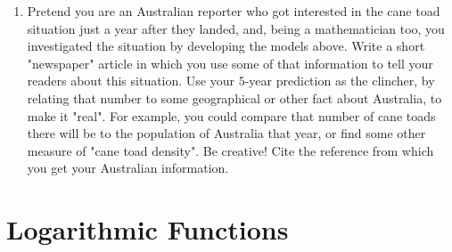 \documentclass[10pt,]{book}
\theoremstyle{plain}
\theoremstyle{definition}
\theoremstyle{definition}
\theoremstyle{definition}
\numberwithin{equation}{section}
\begin{document}
\begin{exerciselist}
\begin{enumerate}[label=(\alph*)]
\item\hypertarget{li-171}{}Pretend you are an Australian reporter who got interested in the cane toad situation just a year after they landed, and, being a mathematician too, you investigated the situation by developing the models above.  Write a short "newspaper" article in which you use some of that information to tell your readers about this situation.  Use your \(5\)-year prediction as the clincher, by relating that number to some geographical or other fact about Australia, to make it "real".  For example, you could compare that number of cane toads there will be to the population of Australia that year, or find some other measure of "cane toad density".  Be creative!  Cite the reference from which you get your Australian information.%
\end{enumerate}
\par\smallskip
\end{exerciselist}
\typeout{************************************************}
\typeout{************************************************}
\chapter[{Logarithmic Functions}]{Logarithmic Functions}\label{chapter05}
\typeout{************************************************}
\typeout{************************************************}
\end{document}
